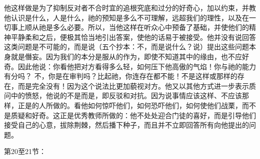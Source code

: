 他这样做是为了抑制反对者不合时宜的追根究底和过分的好奇心，加以约束，并教他认识是什么，人是什么，祂的预知是多么不可理解，远超我们的理性，以及在一切事上顺从祂是多么必要。所以，当他这样在听众心中预备了基础，并使他们的精神平静柔和之后，便极其恰当地引出答案，使他的话易于被接受。他并没有说回答这类问题是不可能的，而是说（五个抄本：不，而是说什么？说）提出这些问题本身就是僭妄。因为我们的本分是服从的作为，即使不知道其中的缘由，也不应好奇。因此他说：你看他把对方看得多么轻，如何压下他高傲的气焰！你与祂的能力有分吗？ 不，你是在审判吗？比起祂，你连存在都不能！不是这样或那样的存在，而是完全没有！因为这个说法比更加藐视对方。他又以其他方式进一步表示质问中的愤怒，他说的不是而是，即反驳和对抗。因为说事情应该这样、不应该那样，正是的人所做的。看他如何惊吓他们，如何恐吓他们，如何使他们战栗，而不是质疑和好奇。这正是优秀教师所做的：他不处处迎合门徒的喜好，而是引导他们接受自己的心意，拔除荆棘，然后播下种子，而且并不立即回答所有向他提出的问题。\par

第20至21节：\par

